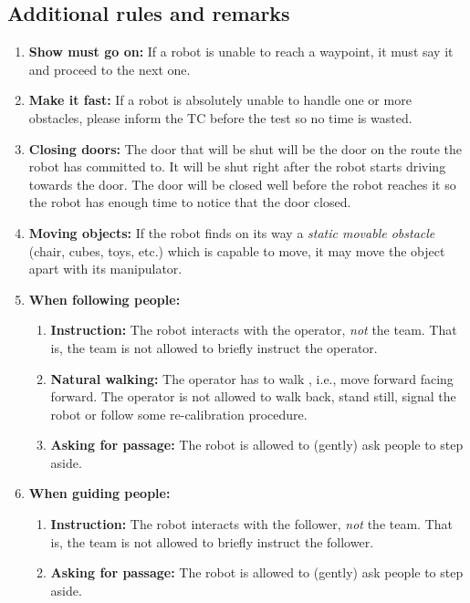 \subsection{Additional rules and remarks}
\begin{enumerate}
	\item \textbf{Show must go on:} If a robot is unable to reach a waypoint, it must say it and proceed to the next one.
	\item \textbf{Make it fast:} If a robot is absolutely unable to handle one or more obstacles, please inform the TC before the test so no time is wasted.
	\item \textbf{Closing doors:}  The door that will be shut will be the door on the route the robot has committed to. 
	  It will be shut right after the robot starts driving towards the door. 
	  The door will be closed well before the robot reaches it so the robot has enough time to notice that the door closed.	
	\item \textbf{Moving objects:} If the robot finds on its way a \textit{static movable obstacle} (chair, cubes, toys, etc.) which is capable to move, it may move the object apart with its manipulator.
	\item \textbf{When following people:} 
	\begin{enumerate}
		\item \textbf{Instruction:} The robot interacts with the operator, \emph{not} the team. That is, the team is not allowed to briefly instruct the operator.
		\item \textbf{Natural walking:} The operator has to walk , i.e., move forward facing forward. 
		  The operator is not allowed to walk back, stand still, signal the robot or follow some re-calibration procedure.
		\item \textbf{Asking for passage:} The robot is allowed to (gently) ask people to step aside.
	\end{enumerate}
	
	\item \textbf{When guiding people:} 
	\begin{enumerate}
		\item \textbf{Instruction:} The robot interacts with the follower, \emph{not} the team. 
		  That is, the team is not allowed to briefly instruct the follower.
		\item \textbf{Asking for passage:} The robot is allowed to (gently) ask people to step aside.
	\end{enumerate}
\end{enumerate}

